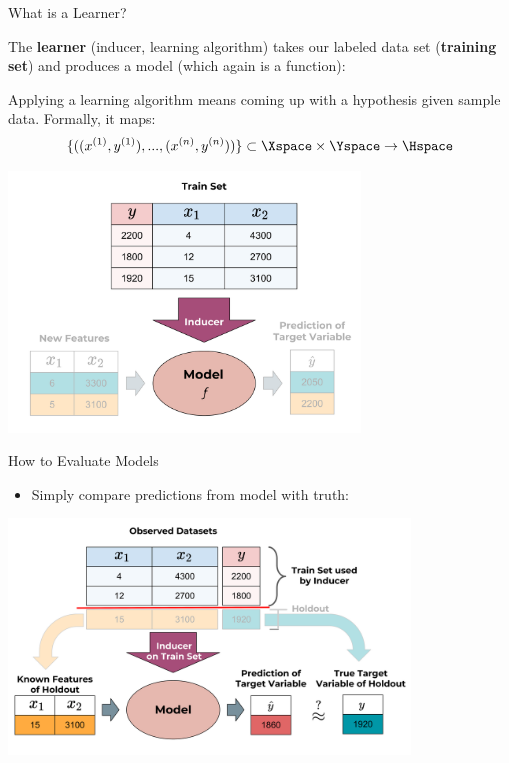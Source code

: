 \begin{frame}{What is a Learner?}

The \textbf{learner} (inducer, learning algorithm) takes our labeled data set
(\textbf{training set}) and produces a model (which again is a
function):

Applying a learning algorithm means coming up with a hypothesis given sample data. 
Formally, it maps:
$$\{((x^{(1)},y^{(1)}),...,(x^{(n)},y^{(n)}))\} \subset \Xspace \times \Yspace \rightarrow \Hspace$$

\vspace{-0.5cm}

\scriptsize

\begin{center}\includegraphics[width=0.7\textwidth]{plots/the_inducer_web} \end{center}

\normalsize 

\end{frame}

\begin{frame}{How to Evaluate Models}

\begin{itemize}

\item
  Simply compare predictions from model with truth:
\end{itemize}

\scriptsize

\begin{center}\includegraphics[width=0.8\textwidth]{plots/eval_inducer1_web} \end{center}

\normalsize 
\end{frame}

